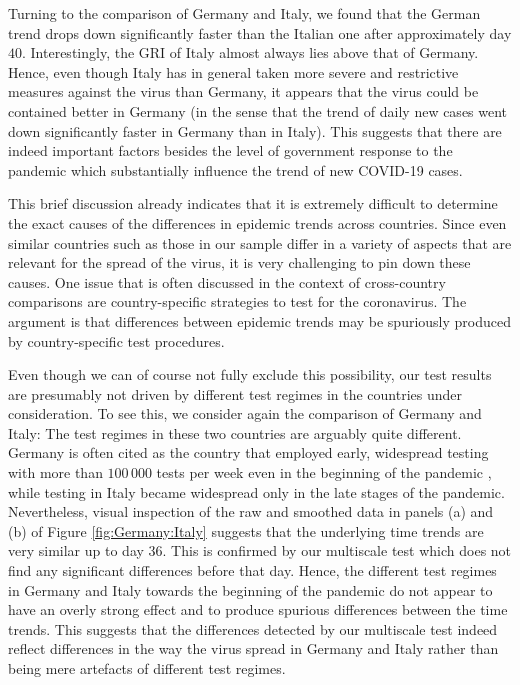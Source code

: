 \documentclass[a4paper,12pt]{article}
\numberwithin{equation}{section}
\begin{document}
Turning to the comparison of Germany and Italy, we found that the German trend drops down significantly faster than the Italian one after approximately day $40$. Interestingly, the GRI of Italy almost always lies above that of Germany. Hence, even though Italy has in general taken more severe and restrictive measures against the virus than Germany, it appears that the virus could be contained better in Germany (in the sense that the trend of daily new cases went down significantly faster in Germany than in Italy). This suggests that there are indeed important factors besides the level of government response to the pandemic which substantially influence the trend of new COVID-19 cases. 


This brief discussion already indicates that it is extremely difficult to determine the exact causes of the differences in epidemic trends across countries. Since even similar countries such as those in our sample differ in a variety of aspects that are relevant for the spread of the virus, it is very challenging to pin down these causes. One issue that is often discussed in the context of cross-country comparisons are country-specific strategies to test for the coronavirus. The argument is that differences between epidemic trends may be spuriously produced by country-specific test procedures.


Even though we can of course not fully exclude this possibility, our test results are presumably not driven by different test regimes in the countries under consideration. To see this, we consider again the comparison of Germany and Italy: The test regimes in these two countries are arguably quite different. Germany is often cited as the country that employed early, widespread testing with more than $100\,000$ tests per week even in the beginning of the pandemic \citep{Cohen2020}, while testing in Italy became widespread only in the late stages of the pandemic. 
Nevertheless, visual inspection of the raw and smoothed data in panels (a) and (b) of Figure \ref{fig:Germany:Italy} suggests that the underlying time trends are very similar up to day $36$. This is confirmed by our multiscale test which does not find any significant differences before that day. Hence, the different test regimes in Germany and Italy towards the beginning of the pandemic do not appear to have an overly strong effect and to produce spurious differences between the time trends. This suggests that the differences detected by our multiscale test indeed reflect differences in the way the virus spread in Germany and Italy rather than being mere artefacts of different test regimes. 
\end{document}
